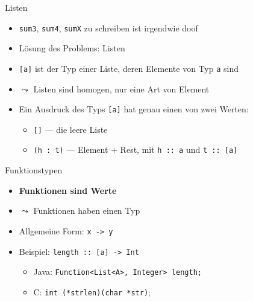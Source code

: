 \documentclass{beamer}
\begin{document}
\begin{frame}{Listen}
        \begin{itemize}
                \item \texttt{sum3}, \texttt{sum4}, \texttt{sumX} zu schreiben ist irgendwie doof
                \pause
                \item Lösung des Problems: Listen
                \item \texttt{[a]} ist der Typ einer Liste, deren Elemente von Typ \texttt{a} sind
                \item $\leadsto$ Listen sind homogen, nur eine Art von Element
        \end{itemize}


        \begin{itemize}
                \item Ein Ausdruck des Typs \texttt{[a]} hat genau einen von zwei Werten:
                \begin{itemize}
                        \item \texttt{[]} --- die leere Liste
                        \item \texttt{(h : t)} --- Element + Rest, mit \texttt{h :: a} und \texttt{t :: [a]}
                \end{itemize}
        \end{itemize}
\end{frame}

\begin{frame}{Funktionstypen}
        \begin{itemize}
                \item \textbf{Funktionen sind Werte}
                \item $\leadsto$ Funktionen haben einen Typ
                \item Allgemeine Form: \texttt{x -> y}
                \item Beispiel: \texttt{length :: [a] -> Int}
                \begin{itemize}
                        \item Java: \texttt{Function<List<A>, Integer> length;}
                        \item C: \texttt{int (*strlen)(char *str)};
                \end{itemize}
        \end{itemize}
\end{frame}
\end{document}
